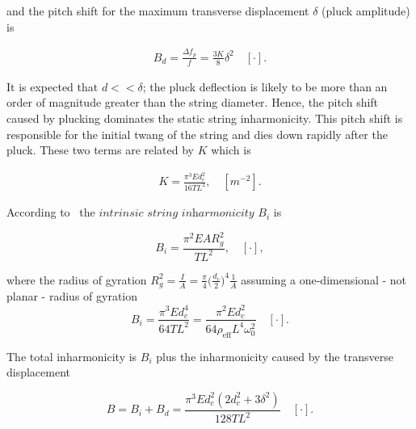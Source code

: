\documentclass{article}
\begin{document}
\begin{sloppy}
and the pitch shift for the maximum transverse displacement $\delta$ (pluck amplitude) is  

\begin{align}
    B_d = \frac {\Delta f_p}{f} = \frac {3K}{8} \delta^2 \quad [\cdot]. 
\end{align}

It is expected that $d<<\delta$; the pluck deflection is likely to be more than an order of magnitude greater than the string diameter. Hence, the pitch shift caused by plucking dominates the static string inharmonicity. This pitch shift is responsible for the initial twang of the string and dies down rapidly after the pluck. These two terms are related by $K$ which is

\begin{align}
    K = \frac {\pi^3 E d_c^2}{16 T L^2}, \quad [m^{-2}].
\end{align}

According to~\cite{fletcher:piano_model} the $\textit{intrinsic string inharmonicity}$ $B_i$ is

\begin{equation}
    B_i = \frac{\pi^2 E A R_g^2}{T L^2}, \quad [\cdot],
\end{equation}

where the radius of gyration $R_g^2 = \frac{I}{A} = \frac{\pi}{4}\big(\frac{d_c}{2}\big)^4 \frac{1}{A}$ assuming a one-dimensional - not planar - radius of gyration
%
\begin{equation}
    B_i =  \frac{\pi^3 E d_c^4}{64 T L^2} = \frac{\pi^2 E d_c^2}{64\rho_{\text{eff}} L^4 \omega_0^2}\quad [\cdot].
\end{equation}

The total inharmonicity is $B_i$ plus the inharmonicity caused by the transverse displacement

\begin{equation}
    B =  B_i + B_d =  \frac{\pi^3 E d_c^2(2d_c^2 + 3\delta^2)}{128 T L^2}\quad [\cdot] .
\end{equation}
%

\end{sloppy}
\end{document}
